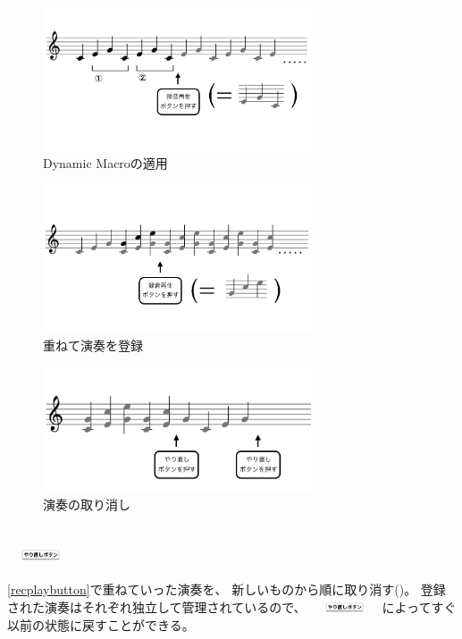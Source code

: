 \begin{figure}[tb]
\includegraphics[width=8cm,bb=0 0 1054 481]{images/rp2.png}
\centering
\caption{Dynamic Macroの適用}
\label{recplay2}
\end{figure}

\begin{figure}[tb]
\includegraphics[width=8cm,bb=0 0 1054 481]{images/rp3.png}
\centering
\caption{重ねて演奏を登録}
\label{recplay3}
\end{figure}

\begin{figure}[tb]
\includegraphics[width=8cm,bb=0 0 1054 481]{images/rp4.png}
\centering
\caption{演奏の取り消し}
\label{recplay4}
\end{figure}

\subsection{\protect\includegraphics[height=3mm,width=20mm,bb=3 23 360 80]{images/undobutton.png}}

\ref{recplaybutton}で重ねていった演奏を、
新しいものから順に取り消す()。
登録された演奏はそれぞれ独立して管理されているので、
\includegraphics[height=3mm,width=20mm,bb=3 23 360 80]{images/undobutton.png}
によってすぐ以前の状態に戻すことができる。
